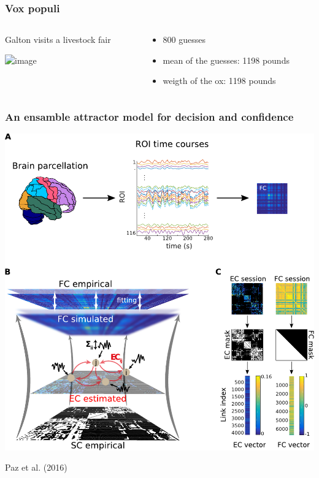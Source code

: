 \documentclass[final]{beamer}
\begin{document}
\begin{frame}
\frametitle{Vox populi}
\begin{columns}
\begin{column}{0.5\textwidth}
Galton visits a livestock fair
\begin{center}
\includegraphics<1->[width=0.9\columnwidth]{galton}
\end{center}
\end{column}
\begin{column}{0.5\textwidth}
			\pause
	\begin{itemize}
		\item 800 guesses 
			\pause
		\item mean of the guesses: 1198 pounds
			\pause
		\item weigth of the ox: 1198 pounds
	\end{itemize}
\end{column}
\end{columns}
\end{frame}

\begin{frame}
\frametitle{An ensamble attractor model for decision and confidence}
\pause
\begin{center}
\includegraphics[width=0.9\columnwidth]{fig1}
\end{center}
\vspace{1cm}
\tiny{Paz et al. (2016)}
\end{frame}
\end{document}
